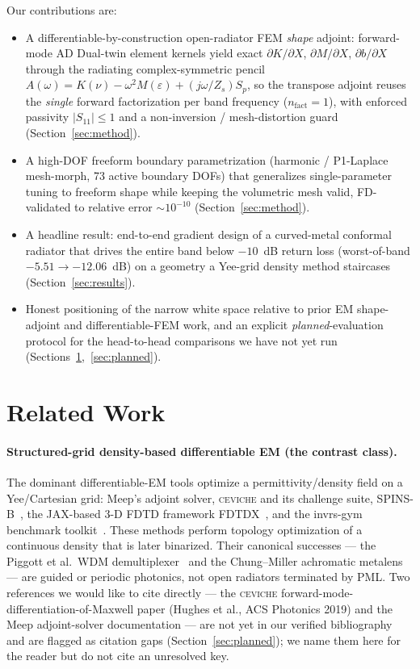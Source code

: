 \documentclass{anvil-paper}
\begin{document}
Our contributions are:
\begin{itemize}
  \item A differentiable-by-construction open-radiator FEM \emph{shape} adjoint:
  forward-mode AD Dual-twin element kernels yield exact
  $\partial K/\partial X$, $\partial M/\partial X$, $\partial b/\partial X$
  through the radiating complex-symmetric pencil
  $A(\omega)=K(\nu)-\omega^2 M(\varepsilon)+(j\omega/Z_s)S_p$, so the transpose
  adjoint reuses the \emph{single} forward factorization per band frequency
  ($n_{\text{fact}}=1$), with enforced passivity $|S_{11}|\le 1$ and a
  non-inversion / mesh-distortion guard (Section~\ref{sec:method}).
  \item A high-DOF freeform boundary parametrization (harmonic / P1-Laplace
  mesh-morph, 73 active boundary DOFs) that generalizes single-parameter tuning
  to freeform shape while keeping the volumetric mesh valid, FD-validated to
  relative error $\sim\!10^{-10}$ (Section~\ref{sec:method}).
  \item A headline result: end-to-end gradient design of a curved-metal
  conformal radiator that drives the entire band below $-10$~dB return loss
  (worst-of-band $-5.51 \to -12.06$~dB) on a geometry a Yee-grid density method
  staircases (Section~\ref{sec:results}).
  \item Honest positioning of the narrow white space relative to prior EM
  shape-adjoint and differentiable-FEM work, and an explicit
  \emph{planned}-evaluation protocol for the head-to-head comparisons we have
  not yet run (Sections~\ref{sec:related},~\ref{sec:planned}).
\end{itemize}

\section{Related Work}
\label{sec:related}

\paragraph{Structured-grid density-based differentiable EM (the contrast class).}
The dominant differentiable-EM tools optimize a permittivity/density field on a
Yee/Cartesian grid: Meep's adjoint solver, \textsc{ceviche} and its
challenge suite, SPINS-B~\cite{su_spinsb}, the JAX-based 3-D FDTD framework
FDTDX~\cite{fdtdx}, and the invrs-gym benchmark toolkit~\cite{invrsgym}. These
methods perform topology optimization of a continuous density that is later
binarized. Their canonical successes --- the Piggott et al.\ WDM
demultiplexer~\cite{piggott2015} and the Chung--Miller achromatic
metalens~\cite{chung2020} --- are guided or periodic photonics, not open
radiators terminated by PML. Two references we would like to cite directly ---
the \textsc{ceviche} forward-mode-differentiation-of-Maxwell paper (Hughes et
al., ACS Photonics 2019) and the Meep adjoint-solver documentation --- are not
yet in our verified bibliography and are flagged as citation gaps
(Section~\ref{sec:planned}); we name them here for the reader but do not cite an
unresolved key.
\end{document}

